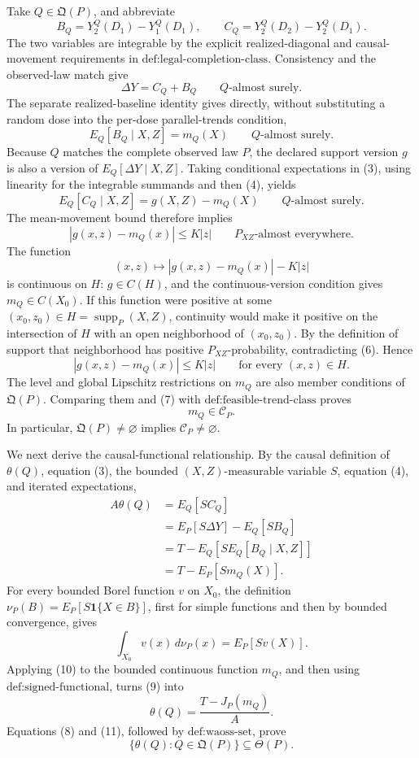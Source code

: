 Take \(Q\in\mathfrak Q(P)\), and abbreviate
\[
B_Q=Y_2^Q(D_1)-Y_1^Q(D_1),
\qquad
C_Q=Y_2^Q(D_2)-Y_2^Q(D_1).
\]
The two variables are integrable by the explicit realized-diagonal and causal-movement requirements in \(\text{def:legal-completion-class}\). Consistency and the observed-law match give
\[
\Delta Y=C_Q+B_Q
\qquad Q\text{-almost surely}. \tag{3}
\]
The separate realized-baseline identity gives directly, without substituting a random dose into the per-dose parallel-trends condition,
\[
E_Q[B_Q\mid X,Z]=m_Q(X)
\qquad Q\text{-almost surely}. \tag{4}
\]
Because \(Q\) matches the complete observed law \(P\), the declared support version \(g\) is also a version of \(E_Q[\Delta Y\mid X,Z]\). Taking conditional expectations in (3), using linearity for the integrable summands and then (4), yields
\[
E_Q[C_Q\mid X,Z]=g(X,Z)-m_Q(X)
\qquad Q\text{-almost surely}. \tag{5}
\]
The mean-movement bound therefore implies
\[
|g(x,z)-m_Q(x)|\leq K|z|
\qquad P_{XZ}\text{-almost everywhere}. \tag{6}
\]
The function
\[
(x,z)\longmapsto |g(x,z)-m_Q(x)|-K|z|
\]
is continuous on \(H\): \(g\in C(H)\), and the continuous-version condition gives \(m_Q\in C(X_0)\). If this function were positive at some \((x_0,z_0)\in H=\operatorname{supp}_P(X,Z)\), continuity would make it positive on the intersection of \(H\) with an open neighborhood of \((x_0,z_0)\). By the definition of support that neighborhood has positive \(P_{XZ}\)-probability, contradicting (6). Hence
\[
|g(x,z)-m_Q(x)|\leq K|z|
\qquad\text{for every }(x,z)\in H. \tag{7}
\]
The level and global Lipschitz restrictions on \(m_Q\) are also member conditions of \(\mathfrak Q(P)\). Comparing them and (7) with \(\text{def:feasible-trend-class}\) proves
\[
m_Q\in\mathcal C_P. \tag{8}
\]
In particular, \(\mathfrak Q(P)\neq\varnothing\) implies \(\mathcal C_P\neq\varnothing\).

We next derive the causal-functional relationship. By the causal definition of \(\theta(Q)\), equation (3), the bounded \((X,Z)\)-measurable variable \(S\), equation (4), and iterated expectations,
\[
\begin{aligned}
A\theta(Q)
&=E_Q[SC_Q]\\
&=E_P[S\Delta Y]-E_Q[SB_Q]\\
&=T-E_Q\!\left[S E_Q[B_Q\mid X,Z]\right]\\
&=T-E_P[Sm_Q(X)].
\end{aligned} \tag{9}
\]
For every bounded Borel function \(v\) on \(X_0\), the definition
\(\nu_P(B)=E_P[S\mathbf 1\{X\in B\}]\), first for simple functions and then by bounded convergence, gives
\[
\int_{X_0}v(x)\,d\nu_P(x)=E_P[Sv(X)]. \tag{10}
\]
Applying (10) to the bounded continuous function \(m_Q\), and then using \(\text{def:signed-functional}\), turns (9) into
\[
\theta(Q)=\frac{T-J_P(m_Q)}{A}. \tag{11}
\]
Equations (8) and (11), followed by \(\text{def:waoss-set}\), prove
\[
\{\theta(Q):Q\in\mathfrak Q(P)\}\subseteq\Theta(P). \tag{12}
\]

